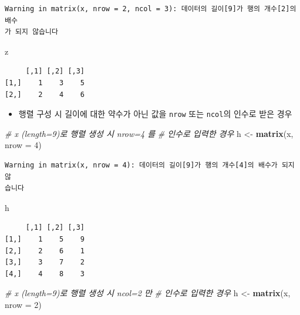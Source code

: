 \documentclass[
  11pt,
]{krantz}
\newenvironment{Shaded}{\begin{snugshade}}{\end{snugshade}}
\newcommand{\CommentTok}[1]{\textcolor[rgb]{0.37,0.37,0.37}{\textit{#1}}}
\newcommand{\DataTypeTok}[1]{\textcolor[rgb]{0.27,0.27,0.27}{#1}}
\newcommand{\DecValTok}[1]{\textcolor[rgb]{0.06,0.06,0.06}{#1}}
\newcommand{\KeywordTok}[1]{\textcolor[rgb]{0.27,0.27,0.27}{\textbf{#1}}}
\newcommand{\NormalTok}[1]{#1}
\newcommand{\StringTok}[1]{\textcolor[rgb]{0.5,0.5,0.5}{#1}}
\providecommand{\tightlist}{%
  \setlength{\itemsep}{0pt}\setlength{\parskip}{0pt}}
\begin{document}
\begin{verbatim}
Warning in matrix(x, nrow = 2, ncol = 3): 데이터의 길이[9]가 행의 개수[2]의 배수
가 되지 않습니다
\end{verbatim}

\begin{Shaded}
\begin{Highlighting}[]
\NormalTok{z}
\end{Highlighting}
\end{Shaded}

\begin{verbatim}
     [,1] [,2] [,3]
[1,]    1    3    5
[2,]    2    4    6
\end{verbatim}

\normalsize

\begin{itemize}
\tightlist
\item
  행렬 구성 시 길이에 대한 약수가 아닌 값을 \texttt{nrow} 또는 \texttt{ncol}의 인수로 받은 경우
\end{itemize}

\footnotesize

\begin{Shaded}
\begin{Highlighting}[]
\CommentTok{# x (length=9)로 행렬 생성 시 nrow=4 를}
\CommentTok{# 인수로 입력한 경우}
\NormalTok{h <-}\StringTok{ }\KeywordTok{matrix}\NormalTok{(x, }\DataTypeTok{nrow =} \DecValTok{4}\NormalTok{)}
\end{Highlighting}
\end{Shaded}

\begin{verbatim}
Warning in matrix(x, nrow = 4): 데이터의 길이[9]가 행의 개수[4]의 배수가 되지 않
습니다
\end{verbatim}

\begin{Shaded}
\begin{Highlighting}[]
\NormalTok{h}
\end{Highlighting}
\end{Shaded}

\begin{verbatim}
     [,1] [,2] [,3]
[1,]    1    5    9
[2,]    2    6    1
[3,]    3    7    2
[4,]    4    8    3
\end{verbatim}

\begin{Shaded}
\begin{Highlighting}[]
\CommentTok{# x (length=9)로 행렬 생성 시 ncol=2 만 }
\CommentTok{# 인수로 입력한 경우}
\NormalTok{h <-}\StringTok{ }\KeywordTok{matrix}\NormalTok{(x, }\DataTypeTok{nrow =} \DecValTok{2}\NormalTok{)}
\end{Highlighting}
\end{Shaded}
\end{document}
